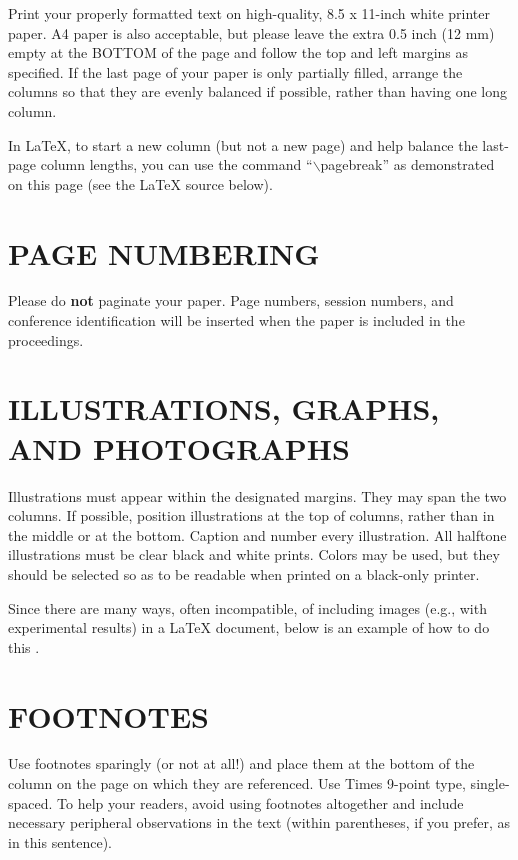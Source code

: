 \documentclass{article}
\begin{document}
Print your properly formatted text on high-quality, 8.5 x 11-inch white printer
paper. A4 paper is also acceptable, but please leave the extra 0.5 inch (12 mm)
empty at the BOTTOM of the page and follow the top and left margins as
specified.  If the last page of your paper is only partially filled, arrange
the columns so that they are evenly balanced if possible, rather than having
one long column.

In LaTeX, to start a new column (but not a new page) and help balance the
last-page column lengths, you can use the command ``$\backslash$pagebreak'' as
demonstrated on this page (see the LaTeX source below).

\section{PAGE NUMBERING}
\label{sec:page}

Please do {\bf not} paginate your paper.  Page numbers, session numbers, and
conference identification will be inserted when the paper is included in the
proceedings.

\section{ILLUSTRATIONS, GRAPHS, AND PHOTOGRAPHS}
\label{sec:illust}

Illustrations must appear within the designated margins.  They may span the two
columns.  If possible, position illustrations at the top of columns, rather
than in the middle or at the bottom.  Caption and number every illustration.
All halftone illustrations must be clear black and white prints.  Colors may be
used, but they should be selected so as to be readable when printed on a
black-only printer.

Since there are many ways, often incompatible, of including images (e.g., with
experimental results) in a LaTeX document, below is an example of how to do
this \cite{Lamp86}.

\section{FOOTNOTES}
\label{sec:foot}

Use footnotes sparingly (or not at all!) and place them at the bottom of the
column on the page on which they are referenced. Use Times 9-point type,
single-spaced. To help your readers, avoid using footnotes altogether and
include necessary peripheral observations in the text (within parentheses, if
you prefer, as in this sentence).
\end{document}
